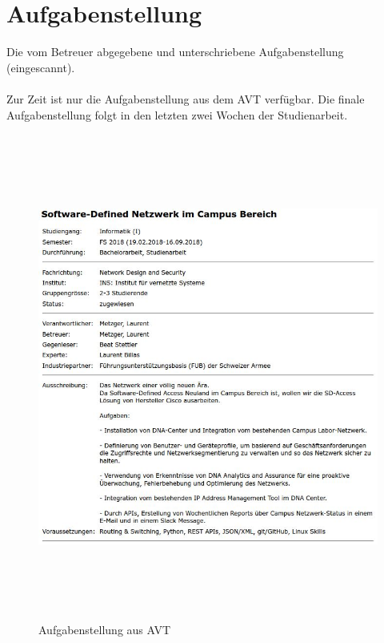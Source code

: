 \section{Aufgabenstellung}
Die vom Betreuer abgegebene und unterschriebene Aufgabenstellung (eingescannt). \\
\\
Zur Zeit ist nur die Aufgabenstellung aus dem AVT verfügbar. Die finale Aufgabenstellung folgt in den letzten zwei Wochen der Studienarbeit.

\begin{figure}[H]
	\centering
	\includegraphics[height=16cm]{img/aufgabenstellung.jpg}
	\caption{Aufgabenstellung aus AVT}
	\label{fig:Aufgabenstellung}
\end{figure}
